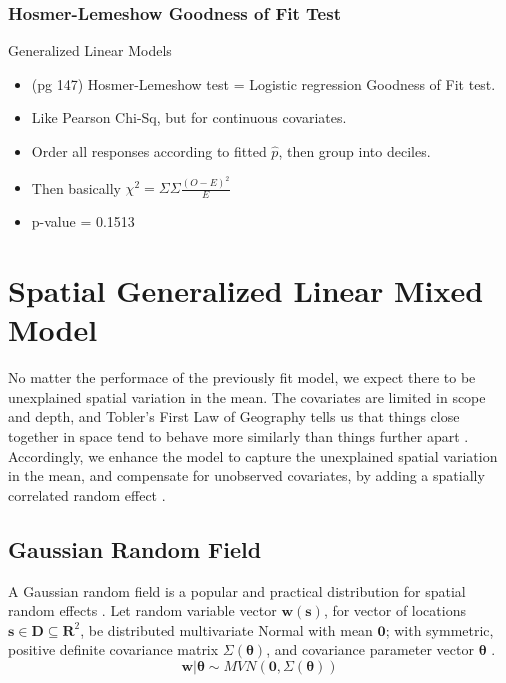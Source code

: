 \documentclass{article}
\begin{document}
\subsubsection{Hosmer-Lemeshow Goodness of Fit Test} %
Generalized Linear Models \citep{Myers2012}

  \begin{itemize} %
  \item (pg 147) Hosmer-Lemeshow test = Logistic regression Goodness of Fit test. 
  \item Like Pearson Chi-Sq, but for continuous covariates. 
  \item Order all responses according to fitted $\hat{p}$, then group into deciles. 
  \item Then basically $\chi^{2} = \Sigma \Sigma \frac{(O - E)^{2}}{E}$
  \item p-value = 0.1513
  \end{itemize}

\section{Spatial Generalized Linear Mixed Model}

No matter the performace of the previously fit model, we expect there to be unexplained spatial variation in the mean. The covariates are limited in scope and depth, and Tobler's First Law of Geography tells us that things close together in space tend to behave more similarly than things further apart \citep{Tobler1970}. Accordingly, we enhance the model to capture the unexplained spatial variation in the mean, and compensate for unobserved covariates, by adding a spatially correlated random effect  \citep{Banerjee2008}. 

\subsection{Gaussian Random Field}

A Gaussian random field is a popular and practical distribution for spatial random effects \citep{Gelfand2010}. Let random variable vector $\pmb{w}(\pmb{s})$, for vector of locations $\pmb{s} \in \pmb{D} \subseteq \pmb{R}^{2}$, be distributed multivariate Normal with mean $\pmb{0}$; with symmetric, positive definite covariance matrix $\Sigma(\pmb{\theta})$, and covariance parameter vector $\pmb{\theta}$ \citep{Haran2011}.
$$\pmb{w} | \pmb{\theta} \sim MVN(\pmb{0}, \Sigma(\pmb{\theta})) $$
\end{document}
